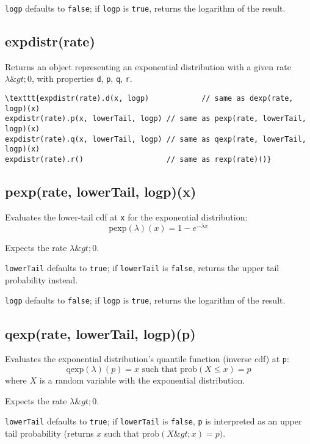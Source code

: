 \documentclass{article}
\begin{document}
\texttt{logp} defaults to \texttt{false}; if \texttt{logp} is \texttt{true}, returns the
logarithm of the result.


    \subsection*{expdistr(rate)}
    Returns an object representing an exponential distribution with a
given rate $\lambda \&gt; 0$,
with properties \texttt{d}, \texttt{p}, \texttt{q}, \texttt{r}.


\begin{lstlisting}
\texttt{expdistr(rate).d(x, logp)            // same as dexp(rate, logp)(x)
expdistr(rate).p(x, lowerTail, logp) // same as pexp(rate, lowerTail, logp)(x)
expdistr(rate).q(x, lowerTail, logp) // same as qexp(rate, lowerTail, logp)(x)
expdistr(rate).r()                   // same as rexp(rate)()}\end{lstlisting}

    \subsection*{pexp(rate, lowerTail, logp)(x)}
    Evaluates the lower-tail cdf at \texttt{x} for the exponential distribution:
$$\textrm{pexp}(\lambda)(x) = 1 - e^{-\lambda x}$$


Expects the rate $\lambda \&gt; 0$.


\texttt{lowerTail} defaults to \texttt{true}; if \texttt{lowerTail} is \texttt{false}, returns
the upper tail probability instead.


\texttt{logp} defaults to \texttt{false}; if \texttt{logp} is \texttt{true}, returns the logarithm
of the result.


    \subsection*{qexp(rate, lowerTail, logp)(p)}
    Evaluates the exponential distribution's quantile function
(inverse cdf) at \texttt{p}:
$$\textrm{qexp}(\lambda)(p) = x \textrm{ such that } \textrm{prob}(X \leq x) = p$$
where $X$ is a random variable with the exponential distribution.


Expects the rate $\lambda \&gt; 0$.


\texttt{lowerTail} defaults to \texttt{true}; if \texttt{lowerTail} is \texttt{false}, \texttt{p} is
interpreted as an upper tail probability (returns
$x$ such that $\textrm{prob}(X \&gt; x) = p)$.
\end{document}
